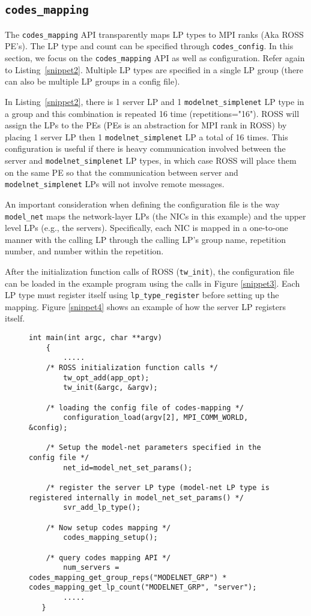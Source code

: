 \documentclass[conference,10pt,compsocconf,onecolumn]{IEEEtran}
\newcommand{\codesmapping}[1]{\texttt{codes\_mapping}}
\newcommand{\codesconfig}[1]{\texttt{codes\_config}}
\newcommand{\codesmodelnet}[1]{\texttt{model\_net}}
\begin{document}
\subsection{\codesmapping{}}
\label{subsec:codes_mapping}

The \codesmapping{} API transparently maps LP types to MPI ranks (Aka ROSS PE's).
The LP type and count can be specified through \codesconfig{}. In this
section, we focus on the \codesmapping{} API as well as configuration. Refer again
to Listing~\ref{snippet2}. Multiple LP types are specified in a single LP group
(there can also be multiple LP groups in a config file).

In Listing~\ref{snippet2}, there is 1 server LP and 1
\texttt{modelnet\_simplenet} LP type in a group and this combination is repeated
16 time (repetitions="16").  ROSS will assign the LPs to the PEs (PEs is an
abstraction for MPI rank in ROSS) by placing 1 server LP then 1
\texttt{modelnet\_simplenet} LP a total of 16 times. This configuration is
useful if there is heavy communication involved between the server and
\texttt{modelnet\_simplenet} LP types, in which case ROSS will place them on the
same PE so that the communication between server and
\texttt{modelnet\_simplenet} LPs will not involve remote messages. 

An important consideration when defining the configuration file is the way
\codesmodelnet{} maps the network-layer LPs (the NICs in this example) and the upper
level LPs (e.g., the servers). Specifically, each NIC is mapped in a one-to-one
manner with the calling LP through the calling LP's group name, repetition
number, and number within the repetition.

After the initialization function calls of ROSS (\texttt{tw\_init}), the configuration
file can be loaded in the example program using the calls in Figure
\ref{snippet3}. Each LP type must register itself using \texttt{lp\_type\_register}
before setting up the mapping. Figure \ref{snippet4} shows an example of how
the server LP registers itself. 

\begin{figure}
\begin{lstlisting}[caption=CODES mapping function calls in example program, label=snippet3]
    int main(int argc, char **argv)
    {
    	.....
	/* ROSS initialization function calls */
    	tw_opt_add(app_opt);
    	tw_init(&argc, &argv);

	/* loading the config file of codes-mapping */
    	configuration_load(argv[2], MPI_COMM_WORLD, &config);

	/* Setup the model-net parameters specified in the config file */
    	net_id=model_net_set_params();
	
	/* register the server LP type (model-net LP type is registered internally in model_net_set_params() */
    	svr_add_lp_type();

	/* Now setup codes mapping */
    	codes_mapping_setup();

	/* query codes mapping API */
    	num_servers = codes_mapping_get_group_reps("MODELNET_GRP") * codes_mapping_get_lp_count("MODELNET_GRP", "server");
    	..... 
   }
\end{lstlisting}
\end{figure}
\end{document}
